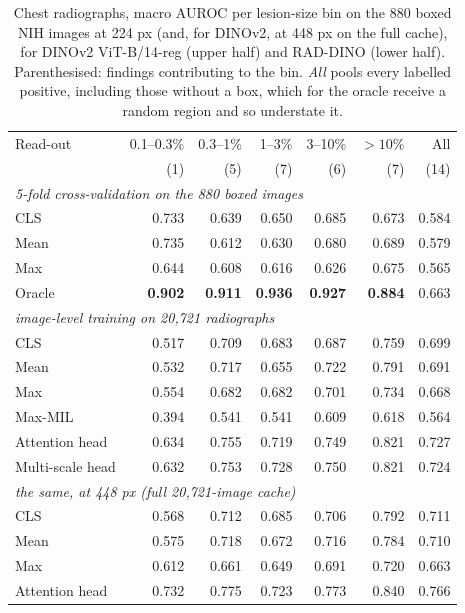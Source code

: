 \documentclass[10pt,letterpaper,twocolumn]{article}
\begin{document}
\begin{table}[t]
\centering\footnotesize\setlength{\tabcolsep}{3.5pt}
\caption{Chest radiographs, macro AUROC per lesion-size bin on the 880 boxed NIH images at
224 px (and, for DINOv2, at 448 px on the full cache), for DINOv2 ViT-B/14-reg (upper half) and RAD-DINO (lower half). Parenthesised:
findings contributing to the bin. \emph{All} pools every labelled positive, including those
without a box, which for the oracle receive a random region and so understate it.}
\label{tab:cxr}
\begin{tabular}{lrrrrrr}
\toprule
Read-out & 0.1--0.3\% & 0.3--1\% & 1--3\% & 3--10\% & $>10\%$ & All \\
 & (1) & (5) & (7) & (6) & (7) & (14) \\
\midrule
\multicolumn{7}{l}{\emph{5-fold cross-validation on the 880 boxed images}} \\
CLS    & 0.733 & 0.639 & 0.650 & 0.685 & 0.673 & 0.584 \\
Mean   & 0.735 & 0.612 & 0.630 & 0.680 & 0.689 & 0.579 \\
Max    & 0.644 & 0.608 & 0.616 & 0.626 & 0.675 & 0.565 \\
Oracle & \textbf{0.902} & \textbf{0.911} & \textbf{0.936} & \textbf{0.927} & \textbf{0.884} & 0.663 \\
\midrule
\multicolumn{7}{l}{\emph{image-level training on 20,721 radiographs}} \\
CLS    & 0.517 & 0.709 & 0.683 & 0.687 & 0.759 & 0.699 \\
Mean   & 0.532 & 0.717 & 0.655 & 0.722 & 0.791 & 0.691 \\
Max    & 0.554 & 0.682 & 0.682 & 0.701 & 0.734 & 0.668 \\
Max-MIL          & 0.394 & 0.541 & 0.541 & 0.609 & 0.618 & 0.564 \\
Attention head   & 0.634 & 0.755 & 0.719 & 0.749 & 0.821 & 0.727 \\
Multi-scale head & 0.632 & 0.753 & 0.728 & 0.750 & 0.821 & 0.724 \\
\multicolumn{7}{l}{\emph{the same, at 448 px (full 20,721-image cache)}} \\
CLS            & 0.568 & 0.712 & 0.685 & 0.706 & 0.792 & 0.711 \\
Mean           & 0.575 & 0.718 & 0.672 & 0.716 & 0.784 & 0.710 \\
Max            & 0.612 & 0.661 & 0.649 & 0.691 & 0.720 & 0.663 \\
Attention head & 0.732 & 0.775 & 0.723 & 0.773 & 0.840 & 0.766 \\

\end{tabular}
\end{table}
\end{document}

